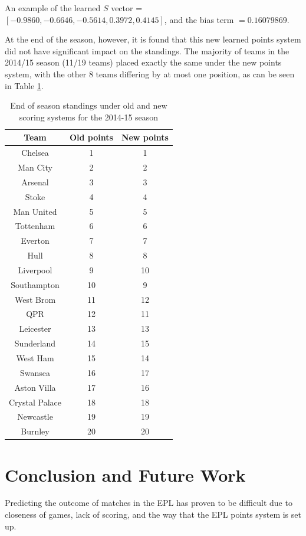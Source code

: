 \documentclass[conference]{IEEEtran}
\begin{document}
An example of the learned $S$ vector = $[-0.9860, -0.6646, -0.5614,  0.3972,  0.4145]$, and the bias term $=0.16079869$.

At the end of the season, however, it is found that this new learned points system did not have significant impact on the standings. The majority of teams in the 2014/15 season (11/19 teams) placed exactly the same under the new points system, with the other 8 teams differing by at most one position, as can be seen in Table \ref{tab:standings}. 


\begin{table} [h]
	\caption{End of season standings under old and new scoring systems for the 2014-15 season}
	\label{tab:standings}
	\begin{center}
		\begin{tabular}{@{} ccc @{}}
			\hline
			Team & Old points& New points \\ 
			\hline
			Chelsea  &  1  &  1 \\
			Man City  &  2  &  2 \\
			Arsenal  &  3  &  3 \\
			Stoke  &  4  &  4 \\
			Man United  &  5  &  5 \\
			Tottenham  &  6  &  6 \\
			Everton  &  7  &  7 \\
			Hull  &  8  &  8 \\
			Liverpool  &  9  &  10 \\
			Southampton  &  10  &  9 \\
			West Brom  &  11  &  12 \\
			QPR  &  12  &  11 \\
			Leicester  &  13  &  13 \\
			Sunderland  &  14  &  15 \\
			West Ham  &  15  &  14 \\
			Swansea  &  16  &  17 \\
			Aston Villa  &  17  &  16 \\
			Crystal Palace  &  18  &  18 \\
			Newcastle  &  19  &  19 \\
			Burnley  &  20  &  20 \\
			\hline
		\end{tabular}
	\end{center}
\end{table}

\section{Conclusion and Future Work}
Predicting the outcome of matches in the EPL has proven to be difficult due to closeness of games, lack of scoring, and the way that the EPL points system is set up. 
\end{document}
